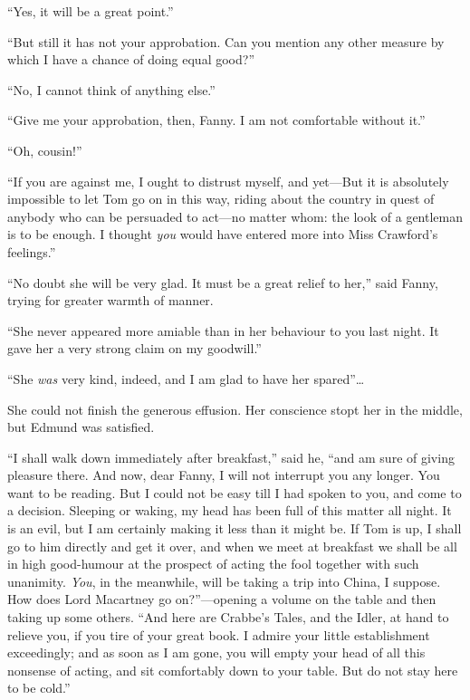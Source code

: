 \documentclass{article}
\begin{document}
``Yes, it will be a great point.''

``But still it has not your approbation.  Can you mention
any other measure by which I have a chance of doing
equal good?''

``No, I cannot think of anything else.''

``Give me your approbation, then, Fanny.  I am not
comfortable without it.''

``Oh, cousin!''

``If you are against me, I ought to distrust myself,
and yet---But it is absolutely impossible to let Tom
go on in this way, riding about the country in quest
of anybody who can be persuaded to act---no matter whom:
the look of a gentleman is to be enough.  I thought \emph{you}
would have entered more into Miss Crawford's feelings.''

``No doubt she will be very glad.  It must be a great relief
to her,'' said Fanny, trying for greater warmth of manner.

``She never appeared more amiable than in her behaviour
to you last night.  It gave her a very strong claim
on my goodwill.''

``She \emph{was} very kind, indeed, and I am glad to have her
spared''\ldots

She could not finish the generous effusion.  Her conscience
stopt her in the middle, but Edmund was satisfied.

``I shall walk down immediately after breakfast,'' said he,
``and am sure of giving pleasure there.  And now, dear Fanny,
I will not interrupt you any longer.  You want to be reading.
But I could not be easy till I had spoken to you,
and come to a decision.  Sleeping or waking, my head
has been full of this matter all night.  It is an evil,
but I am certainly making it less than it might be.
If Tom is up, I shall go to him directly and get it over,
and when we meet at breakfast we shall be all in high
good-humour at the prospect of acting the fool together
with such unanimity.  \emph{You}, in the meanwhile, will be taking
a trip into China, I suppose.  How does Lord Macartney
go on?''---opening a volume on the table and then taking up
some others.  ``And here are Crabbe's Tales, and the Idler,
at hand to relieve you, if you tire of your great book.
I admire your little establishment exceedingly; and as
soon as I am gone, you will empty your head of all this
nonsense of acting, and sit comfortably down to your table.
But do not stay here to be cold.''
\end{document}
